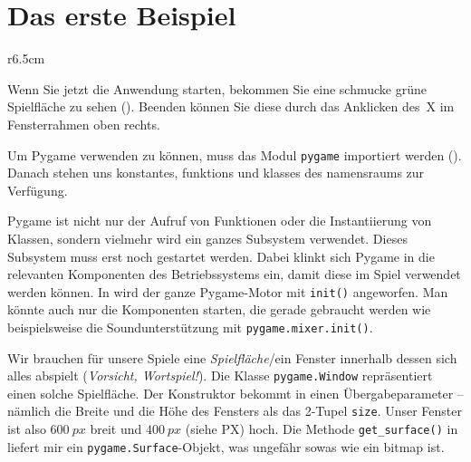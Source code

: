 \section{Das erste Beispiel}


\begin{wrapfigure}[11]{r}{6.5cm}
    \vspace{-1em}
\end{wrapfigure}
Wenn Sie jetzt die Anwendung starten, bekommen Sie eine schmucke grüne Spielfläche zu sehen (). Beenden können Sie diese durch das Anklicken des~X im Fensterrahmen oben rechts.


Um Pygame verwenden zu können, muss das Modul \texttt{pygame} importiert werden (). Danach stehen uns \glspl{konstante}, \glspl{funktion} und \glspl{klasse} des \Gls{namensraum}s zur Verfügung. 


Pygame ist nicht nur der Aufruf von Funktionen oder die Instantiierung von Klassen, sondern vielmehr wird ein ganzes Subsystem verwendet. Dieses Subsystem muss erst noch gestartet werden. Dabei klinkt sich Pygame in die relevanten Komponenten des Betriebssystems ein, damit diese im Spiel verwendet werden können. In  wird der ganze Pygame-Motor mit \texttt{init()} angeworfen. Man könnte auch nur die Komponenten starten, die gerade gebraucht werden wie beispielsweise die Soundunterstützung mit \texttt{pygame.mixer.init()}.

Wir brauchen für unsere Spiele eine \emph{Spielfläche}/ein Fenster innerhalb dessen sich alles abspielt (\emph{Vorsicht, Wortspiel!}). Die Klasse \texttt{pygame.Window} repräsentiert einen solche Spielfläche. Der Konstruktor bekommt in  einen Übergabeparameter -- nämlich die Breite und die Höhe des Fensters als das 2-Tupel \texttt{size}. Unser Fenster ist also $600~px$ breit und $400~px$ (siehe \Gls{PX}) hoch. Die Methode \texttt{get\_surface()}  in  liefert mir ein \texttt{pygame.Surface}-Objekt, was ungefähr sowas wie ein \Gls{bitmap} ist. 

